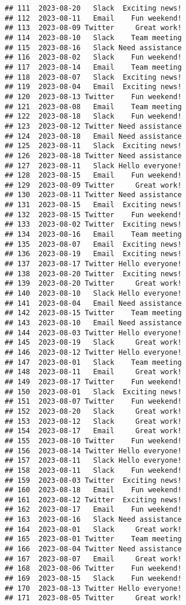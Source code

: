 \documentclass[
]{article}
\begin{document}
\begin{verbatim}
## 111  2023-08-20   Slack  Exciting news!
## 112  2023-08-11   Email    Fun weekend!
## 113  2023-08-09 Twitter     Great work!
## 114  2023-08-10   Slack    Team meeting
## 115  2023-08-16   Slack Need assistance
## 116  2023-08-02   Slack    Fun weekend!
## 117  2023-08-14   Email    Team meeting
## 118  2023-08-07   Slack  Exciting news!
## 119  2023-08-04   Email  Exciting news!
## 120  2023-08-13 Twitter    Fun weekend!
## 121  2023-08-08   Email    Team meeting
## 122  2023-08-18   Slack    Fun weekend!
## 123  2023-08-12 Twitter Need assistance
## 124  2023-08-18   Email Need assistance
## 125  2023-08-11   Slack  Exciting news!
## 126  2023-08-18 Twitter Need assistance
## 127  2023-08-11   Slack Hello everyone!
## 128  2023-08-15   Email    Fun weekend!
## 129  2023-08-09 Twitter     Great work!
## 130  2023-08-11 Twitter Need assistance
## 131  2023-08-15   Email  Exciting news!
## 132  2023-08-15 Twitter    Fun weekend!
## 133  2023-08-02 Twitter  Exciting news!
## 134  2023-08-16   Email    Team meeting
## 135  2023-08-07   Email  Exciting news!
## 136  2023-08-19   Email  Exciting news!
## 137  2023-08-17 Twitter Hello everyone!
## 138  2023-08-20 Twitter  Exciting news!
## 139  2023-08-20 Twitter     Great work!
## 140  2023-08-10   Slack Hello everyone!
## 141  2023-08-04   Email Need assistance
## 142  2023-08-15 Twitter    Team meeting
## 143  2023-08-10   Email Need assistance
## 144  2023-08-03 Twitter Hello everyone!
## 145  2023-08-19   Slack     Great work!
## 146  2023-08-12 Twitter Hello everyone!
## 147  2023-08-01   Slack    Team meeting
## 148  2023-08-11   Email     Great work!
## 149  2023-08-17 Twitter    Fun weekend!
## 150  2023-08-01   Slack  Exciting news!
## 151  2023-08-07 Twitter    Fun weekend!
## 152  2023-08-20   Slack     Great work!
## 153  2023-08-12   Slack     Great work!
## 154  2023-08-17   Email     Great work!
## 155  2023-08-10 Twitter    Fun weekend!
## 156  2023-08-14 Twitter Hello everyone!
## 157  2023-08-11   Slack Hello everyone!
## 158  2023-08-11   Slack    Fun weekend!
## 159  2023-08-03 Twitter  Exciting news!
## 160  2023-08-18   Email    Fun weekend!
## 161  2023-08-12 Twitter  Exciting news!
## 162  2023-08-17   Email    Fun weekend!
## 163  2023-08-16   Slack Need assistance
## 164  2023-08-01   Slack     Great work!
## 165  2023-08-01 Twitter    Team meeting
## 166  2023-08-04 Twitter Need assistance
## 167  2023-08-07   Email     Great work!
## 168  2023-08-06 Twitter    Fun weekend!
## 169  2023-08-15   Slack    Fun weekend!
## 170  2023-08-13 Twitter Hello everyone!
## 171  2023-08-05 Twitter     Great work!

\end{verbatim}
\end{document}
